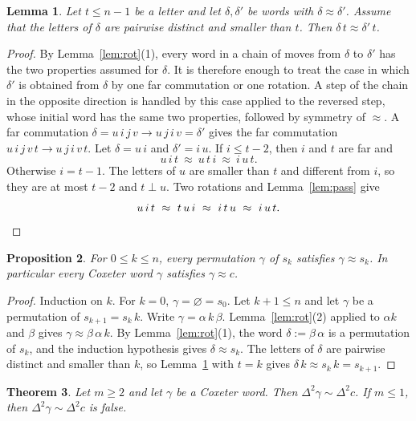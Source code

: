 \documentclass[11pt]{amsart}
\newtheorem{theorem}{Theorem}[section]
\newtheorem{lemma}[theorem]{Lemma}
\newtheorem{proposition}[theorem]{Proposition}
\theoremstyle{definition}
\theoremstyle{remark}
\newcommand{\conj}{\sim}
\newcommand{\rot}{\approx}
\begin{document}
\begin{lemma}\label{lem:lift}
Let $t\le n-1$ be a letter and let $\delta,\delta'$ be words with $\delta\rot\delta'$. Assume that
the letters of $\delta$ are pairwise distinct and smaller than $t$. Then $\delta\,t\rot\delta'\,t$.
\end{lemma}

\begin{proof}
By Lemma~\ref{lem:rot}(1), every word in a chain of moves from $\delta$ to $\delta'$ has the two
properties assumed for $\delta$. It is therefore enough to treat the case in which $\delta'$ is
obtained from $\delta$ by one far commutation or one rotation. A step of the chain in the opposite
direction is handled by this case applied to the reversed step, whose initial word has the same two
properties, followed by symmetry of $\rot$. A far commutation $\delta=u\,i\,j\,v\to u\,j\,i\,v=\delta'$ gives the far
commutation $u\,i\,j\,v\,t\to u\,j\,i\,v\,t$. Let $\delta=u\,i$ and $\delta'=i\,u$. If $i\le t-2$, then
$i$ and $t$ are far and
\[
u\,i\,t\ \rot\ u\,t\,i\ \rot\ i\,u\,t .
\]
Otherwise $i=t-1$. The letters of $u$ are smaller than $t$ and different from $i$, so they are at most
$t-2$ and $t\perp u$. Two rotations and Lemma~\ref{lem:pass} give
\[
u\,i\,t\ \rot\ t\,u\,i\ \rot\ i\,t\,u\ \rot\ i\,u\,t . \qedhere
\]
\end{proof}

\begin{proposition}\label{prop:coxeter}
For $0\le k\le n$, every permutation $\gamma$ of $s_k$ satisfies $\gamma\rot s_k$. In particular
every Coxeter word $\gamma$ satisfies $\gamma\rot c$.
\end{proposition}

\begin{proof}
Induction on $k$. For $k=0$, $\gamma=\varnothing=s_0$. Let $k+1\le n$ and let $\gamma$ be a
permutation of $s_{k+1}=s_k\,k$. Write $\gamma=\alpha\,k\,\beta$. Lemma~\ref{lem:rot}(2) applied to
$\alpha k$ and $\beta$ gives $\gamma\rot\beta\,\alpha\,k$. By Lemma~\ref{lem:rot}(1), the word
$\delta:=\beta\,\alpha$ is a permutation of $s_k$, and the induction hypothesis gives $\delta\rot s_k$.
The letters of $\delta$ are pairwise distinct and smaller than $k$, so Lemma~\ref{lem:lift} with
$t=k$ gives $\delta\,k\rot s_k\,k=s_{k+1}$.
\end{proof}

\begin{theorem}\label{thm:coxeter-conj}
Let $m\ge2$ and let $\gamma$ be a Coxeter word. Then $\Delta^2\gamma\conj\Delta^2c$. If $m\le1$,
then $\Delta^2\gamma\conj\Delta^2c$ is false.
\end{theorem}
\end{document}
